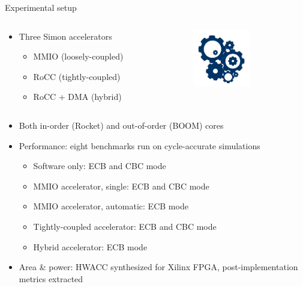 \documentclass[dvipsnames]{beamer}
\begin{document}
\begin{frame}{Experimental setup}
  \begin{minipage}[0.2\textheight]{\textwidth}
    \begin{columns}[T]
      \begin{column}{0.8\textwidth}
        \begin{itemize}
        \item Three Simon accelerators
        \begin{itemize}
        \item MMIO (loosely-coupled)
        \item RoCC (tightly-coupled)
        \item RoCC + DMA (hybrid)
          \end{itemize}
        \end{itemize}
      \end{column}
      \begin{column}{0.2\textwidth}
        \includegraphics[width=2.5cm]{media/cogs.jpeg}
      \end{column}
    \end{columns}
  \end{minipage}
  \begin{itemize}
  \item Both in-order (Rocket) and out-of-order (BOOM) cores
  \item Performance: eight benchmarks run on cycle-accurate simulations
    \begin{itemize}
    \item Software only: ECB and CBC mode
    \item MMIO accelerator, single: ECB and CBC mode
    \item MMIO accelerator, automatic: ECB mode
    \item Tightly-coupled accelerator: ECB and CBC mode
    \item Hybrid accelerator: ECB mode
    \end{itemize}
  \item Area \& power: HWACC synthesized for Xilinx FPGA, post-implementation
    metrics extracted
  \end{itemize}
\end{frame}
\end{document}
